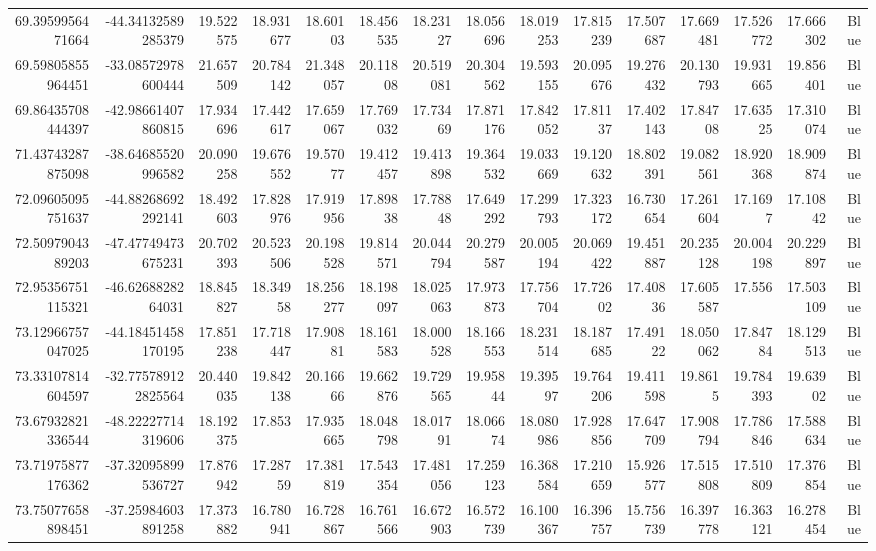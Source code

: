 \begin{center}
\begin{longtable}{rrrrrrrrrrrrrrr}
69.3959956471664 & -44.34132589285379 & 19.522575 & 18.931677 & 18.60103 & 18.456535 & 18.23127 & 18.056696 & 18.019253 & 17.815239 & 17.507687 & 17.669481 & 17.526772 & 17.666302 & Blue \\
69.59805855964451 & -33.08572978600444 & 21.657509 & 20.784142 & 21.348057 & 20.11808 & 20.519081 & 20.304562 & 19.593155 & 20.095676 & 19.276432 & 20.130793 & 19.931665 & 19.856401 & Blue \\
69.86435708444397 & -42.98661407860815 & 17.934696 & 17.442617 & 17.659067 & 17.769032 & 17.73469 & 17.871176 & 17.842052 & 17.81137 & 17.402143 & 17.84708 & 17.63525 & 17.310074 & Blue \\
71.43743287875098 & -38.64685520996582 & 20.090258 & 19.676552 & 19.57077 & 19.412457 & 19.413898 & 19.364532 & 19.033669 & 19.120632 & 18.802391 & 19.082561 & 18.920368 & 18.909874 & Blue \\
72.09605095751637 & -44.88268692292141 & 18.492603 & 17.828976 & 17.919956 & 17.89838 & 17.78848 & 17.649292 & 17.299793 & 17.323172 & 16.730654 & 17.261604 & 17.1697 & 17.10842 & Blue \\
72.5097904389203 & -47.47749473675231 & 20.702393 & 20.523506 & 20.198528 & 19.814571 & 20.044794 & 20.279587 & 20.005194 & 20.069422 & 19.451887 & 20.235128 & 20.004198 & 20.229897 & Blue \\
72.95356751115321 & -46.6268828264031 & 18.845827 & 18.34958 & 18.256277 & 18.198097 & 18.025063 & 17.973873 & 17.756704 & 17.72602 & 17.40836 & 17.605587 & 17.556 & 17.503109 & Blue \\
73.12966757047025 & -44.18451458170195 & 17.851238 & 17.718447 & 17.90881 & 18.161583 & 18.000528 & 18.166553 & 18.231514 & 18.187685 & 17.49122 & 18.050062 & 17.84784 & 18.129513 & Blue \\
73.33107814604597 & -32.775789122825564 & 20.440035 & 19.842138 & 20.16666 & 19.662876 & 19.729565 & 19.95844 & 19.39597 & 19.764206 & 19.411598 & 19.8615 & 19.784393 & 19.63902 & Blue \\
73.67932821336544 & -48.22227714319606 & 18.192375 & 17.853 & 17.935665 & 18.048798 & 18.01791 & 18.06674 & 18.080986 & 17.928856 & 17.647709 & 17.908794 & 17.786846 & 17.588634 & Blue \\
73.71975877176362 & -37.32095899536727 & 17.876942 & 17.28759 & 17.381819 & 17.543354 & 17.481056 & 17.259123 & 16.368584 & 17.210659 & 15.926577 & 17.515808 & 17.510809 & 17.376854 & Blue \\
73.75077658898451 & -37.25984603891258 & 17.373882 & 16.780941 & 16.728867 & 16.761566 & 16.672903 & 16.572739 & 16.100367 & 16.396757 & 15.756739 & 16.397778 & 16.363121 & 16.278454 & Blue \\

\end{longtable}
\end{center}
